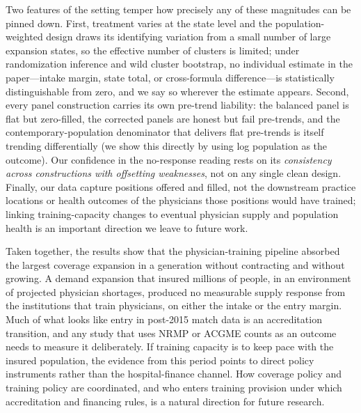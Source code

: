 Two features of the setting temper how precisely any of these magnitudes can be pinned down. First, treatment varies at the state level and the population-weighted design draws its identifying variation from a small number of large expansion states, so the effective number of clusters is limited; under randomization inference and wild cluster bootstrap, no individual estimate in the paper---intake margin, state total, or cross-formula difference---is statistically distinguishable from zero, and we say so wherever the estimate appears. Second, every panel construction carries its own pre-trend liability: the balanced panel is flat but zero-filled, the corrected panels are honest but fail pre-trends, and the contemporary-population denominator that delivers flat pre-trends is itself trending differentially (we show this directly by using log population as the outcome). Our confidence in the no-response reading rests on its \emph{consistency across constructions with offsetting weaknesses}, not on any single clean design. Finally, our data capture positions offered and filled, not the downstream practice locations or health outcomes of the physicians those positions would have trained; linking training-capacity changes to eventual physician supply and population health is an important direction we leave to future work.

Taken together, the results show that the physician-training pipeline absorbed the largest coverage expansion in a generation without contracting and without growing. A demand expansion that insured millions of people, in an environment of projected physician shortages, produced no measurable supply response from the institutions that train physicians, on either the intake or the entry margin. Much of what looks like entry in post-2015 match data is an accreditation transition, and any study that uses NRMP or ACGME counts as an outcome needs to measure it deliberately. If training capacity is to keep pace with the insured population, the evidence from this period points to direct policy instruments rather than the hospital-finance channel. How coverage policy and training policy are coordinated, and who enters training provision under which accreditation and financing rules, is a natural direction for future research.

